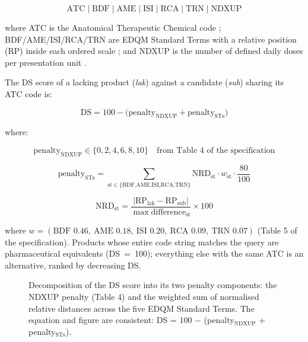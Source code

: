 \documentclass[12pt]{article}
\begin{document}
\begin{equation*}
\text{ATC} \mid \text{BDF} \mid \text{AME} \mid \text{ISI} \mid \text{RCA} \mid \text{TRN} \mid \text{NDXUP}
\end{equation*}

where ATC is the Anatomical Therapeutic Chemical code \citep{who2026atcddd}; BDF/AME/ISI/RCA/TRN are EDQM Standard Terms with a relative position (RP) inside each ordered scale \citep{edqm2024standard,iso202311239}; and NDXUP is the number of defined daily doses per presentation unit \citep{who2026atcddd}.

The DS score of a lacking product (\emph{lak}) against a candidate (\emph{sub}) sharing its ATC code is:

\begin{equation}
\text{DS} = 100 - \bigl(\text{penalty}_{\text{NDXUP}} + \text{penalty}_{\text{STs}}\bigr)
\label{eq:ds}
\end{equation}

where:

\begin{equation}
\text{penalty}_{\text{NDXUP}} \in \{0,2,4,6,8,10\}
\quad\text{from Table 4 of the specification}
\label{eq:ndxup}
\end{equation}

\begin{equation}
\text{penalty}_{\text{STs}} = \sum_{\text{st}\in\{\text{BDF,AME,ISI,RCA,TRN}\}} \text{NRD}_{\text{st}} \cdot w_{\text{st}} \cdot \frac{80}{100}
\label{eq:st}
\end{equation}

\begin{equation}
\text{NRD}_{\text{st}} = \frac{|\text{RP}_{\text{lak}} - \text{RP}_{\text{sub}}|}{\max\text{difference}_{\text{st}}} \times 100
\label{eq:nrd}
\end{equation}

where $w = (\text{BDF }0.46,\ \text{AME }0.18,\ \text{ISI }0.20,\ \text{RCA }0.09,\ \text{TRN }0.07)$ (Table 5 of the specification). Products whose entire code string matches the query are pharmaceutical equivalents (DS~=~100); everything else with the same ATC is an alternative, ranked by decreasing DS.

\begin{figure}[htbp]
\centering
\resizebox{\textwidth}{!}{%
%
}
\caption{Decomposition of the DS score into its two penalty components: the NDXUP penalty (Table 4) and the weighted sum of normalised relative distances across the five EDQM Standard Terms. The equation and figure are consistent: DS = 100 $-$ (penalty$_{\text{NDXUP}}$ + penalty$_{\text{STs}}$).}
\label{fig:ds-formula}
\end{figure}
\end{document}
